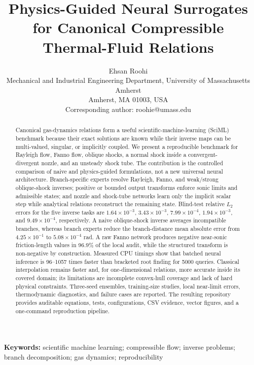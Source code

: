 \documentclass[11pt]{article}
\title{Physics-Guided Neural Surrogates for Canonical Compressible Thermal-Fluid Relations}
\author{Ehsan Roohi\\\small Mechanical and Industrial Engineering Department, University of Massachusetts Amherst\\\small Amherst, MA 01003, USA\\\small Corresponding author: roohie@umass.edu}
\date{}
\newenvironment{revision}{\color{revisionblue}}{}
\newenvironment{revision}{}{}
\begin{document}
\maketitle
\linenumbers

\begin{abstract}
\begin{revision}
Canonical gas-dynamics relations form a useful scientific-machine-learning (SciML) benchmark because their exact solutions are known while their inverse maps can be multi-valued, singular, or implicitly coupled. We present a reproducible benchmark for Rayleigh flow, Fanno flow, oblique shocks, a normal shock inside a convergent-divergent nozzle, and an unsteady shock tube. The contribution is the controlled comparison of naive and physics-guided formulations, not a new universal neural architecture. Branch-specific experts resolve Rayleigh, Fanno, and weak/strong oblique-shock inverses; positive or bounded output transforms enforce sonic limits and admissible states; and nozzle and shock-tube networks learn only the implicit scalar step while analytical relations reconstruct the remaining state. Blind-test relative $L_2$ errors for the five inverse tasks are $1.64\times10^{-3}$, $3.43\times10^{-3}$, $7.99\times10^{-4}$, $1.94\times10^{-3}$, and $9.49\times10^{-4}$, respectively. A naive oblique-shock inverse averages incompatible branches, whereas branch experts reduce the branch-distance mean absolute error from $4.25\times10^{-1}$ to $5.08\times10^{-4}$ rad. A raw Fanno network produces negative near-sonic friction-length values in 96.9\% of the local audit, while the structured transform is non-negative by construction. Measured CPU timings show that batched neural inference is 96--1057 times faster than bracketed root finding for 5000 queries. Classical interpolation remains faster and, for one-dimensional relations, more accurate inside its covered domain; its limitations are incomplete convex-hull coverage and lack of hard physical constraints. Three-seed ensembles, training-size studies, local near-limit errors, thermodynamic diagnostics, and failure cases are reported. The resulting repository provides auditable equations, tests, configurations, CSV evidence, vector figures, and a one-command reproduction pipeline.
\end{revision}
\end{abstract}

\noindent\textbf{Keywords:} scientific machine learning; compressible flow; inverse problems; branch decomposition; gas dynamics; reproducibility
\end{document}
